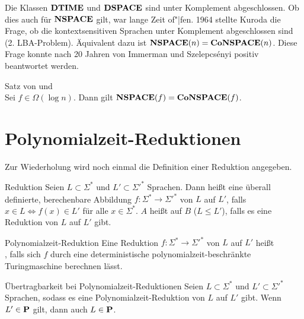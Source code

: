 \begin{Bem}
    Die Klassen $\DTIME$ und $\DSPACE$ sind unter Komplement abgeschlossen.
    Ob dies auch für $\NSPACE$ gilt, war lange Zeit of"|fen.
    1964 stellte Kuroda die Frage, ob die kontextsensitiven Sprachen unter Komplement
    abgeschlossen sind (2. LBA-Problem).
    Äquivalent dazu ist $\NSPACE(n) = \Co\NSPACE(n)$.
    Diese Frage konnte nach 20 Jahren von Immerman und Szelepcsényi positiv beantwortet werden.
\end{Bem}

\begin{Satz}{Satz von  und }\\
    Sei $f \in \Omega(\log n)$.
    Dann gilt $\NSPACE(f) = \Co\NSPACE(f)$.
\end{Satz}

\pagebreak

\section{%
    Polynomialzeit-Reduktionen%
}

\begin{Bem}
    Zur Wiederholung wird noch einmal die Definition einer Reduktion angegeben.
\end{Bem}

\begin{Def}{Reduktion}
    Seien $L \subset \Sigma^\ast$ und $L' \subset \Sigma'^\ast$ Sprachen.
    Dann heißt eine überall definierte, berechenbare Abbildung
    $f\colon \Sigma^\ast \rightarrow \Sigma'^\ast$  von $L$ auf $L'$, falls
    $x \in L \iff f(x) \in L'$ für alle $x \in \Sigma^\ast$.
    $A$ heißt auf $B$  ($L \le L'$), falls es eine Reduktion von $L$ auf $L'$
    gibt.
\end{Def}

\linie

\begin{Def}{Polynomialzeit-Reduktion}
    Eine Reduktion $f\colon \Sigma^\ast \rightarrow \Sigma'^\ast$ von $L$ auf $L'$ heißt\\
    , falls sich $f$ durch eine
    deterministische polynomialzeit-beschränkte Turingmaschine berechnen lässt.
\end{Def}

\begin{Satz}{Übertragbarkeit bei Polynomialzeit-Reduktionen}
    Seien $L \subset \Sigma^\ast$ und $L' \subset \Sigma'^\ast$ Sprachen,
    sodass es eine Polynomialzeit-Reduktion von $L$ auf $L'$ gibt.
    Wenn $L' \in \P$ gilt, dann auch $L \in \P$.
\end{Satz}

